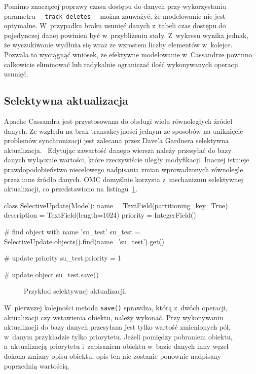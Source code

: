 Pomimo znaczącej poprawy czasu dostępu do danych przy wykorzystaniu parametru \verb+__track_deletes__+ można zauważyć, że modelowanie nie jest optymalne. W~przypadku braku usunięć danych z~tabeli czas dostępu do pojedynczej danej powinien być w~przybliżeniu stały. Z~wykresu wynika jednak, że wyszukiwanie wydłuża się wraz ze wzrostem liczby elementów w~kolejce. Pozwala to wyciągnąć wniosek, że efektywne modelowanie w~Cassandrze powinno całkowicie eliminować lub radykalnie ograniczać ilość wykonywanych operacji usunięć.

\subsection{Selektywna aktualizacja}

Apache Cassandra jest przystosowana do obsługi wielu równoległych źródeł danych. Ze względu na brak transakcyjności jednym ze sposobów na uniknięcie problemów synchronizacji jest zalecana przez Dave'a Gardnera selektywna aktualizacja.~\cite{cassandra_concepts_patterns_antipatterns} Edytując zawartość danego wiersza należy przesyłać do bazy danych wyłącznie wartości, które rzeczywiście uległy modyfikacji. Inaczej istnieje prawdopodobieństwo niecelowego nadpisania zmian wprowadzonych równolegle przez inne źródło danych. OMC domyślnie korzysta z~mechanizmu selektywnej aktualizacji, co przedstawiono na listingu~\ref{lst:selective_update_modeling}.

\begin{verbbox}
class SelectiveUpdate(Model):
    name = TextField(partitioning_key=True)
    description = TextField(length=1024)
    priority = IntegerField()

# find object with name 'su_test'
su_test = SelectiveUpdate.objects().find(name='su_test').get()

# update priority
su_test.priority = 1

# update object
su_test.save()
\end{verbbox}

\begin{figure}[ht!]
	\centering
	\theverbbox
	\caption{Przykład selektywnej aktualizacji.}
	\label{lst:selective_update_modeling}
\end{figure}

W~pierwszej kolejności metoda \verb+save()+ sprawdza, którą z~dwóch operacji, aktualizacji czy wstawienia obiektu, należy wykonać. Przy wykonywaniu aktualizacji do bazy danych przesyłana jest tylko wartość zmienionych pól, w~danym przykładzie tylko priorytetu. Jeżeli pomiędzy pobraniem obiektu, a~aktualizacją priorytetu i~zapisaniem obiektu w~bazie danych inny węzeł dokona zmiany opisu obiektu, opis ten nie zostanie ponownie nadpisany poprzednią wartością.

